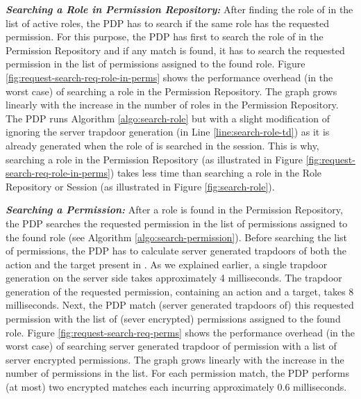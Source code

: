 \documentclass[final,5p,times,twocolumn]{elsarticle}
\begin{document}
\emph{\textbf{Searching a Role in Permission Repository:}}
After finding the role of  in the list of active roles, the PDP has to search if the same role has the requested permission. For this purpose, the PDP has first to search the role of  in the Permission Repository and if any match is found, it has to search the requested permission in the list of permissions assigned to the found role. Figure \ref{fig:request-search-req-role-in-perms} shows the performance overhead (in the worst case) of searching a role in the Permission Repository. The graph grows linearly with the increase in the number of roles in the Permission Repository. The PDP runs Algorithm \ref{algo:search-role} but with a slight modification of ignoring the server trapdoor generation (in Line \ref{line:search-role-td}) as it is already generated when the role of  is searched in the session. This is why, searching a role in the Permission Repository (as illustrated in Figure \ref{fig:request-search-req-role-in-perms}) takes less time than searching a role in the Role Repository or Session (as illustrated in Figure \ref{fig:search-role}).

\emph{\textbf{Searching a Permission:}}
After a role is found in the Permission Repository, the PDP searches the requested permission in the list of permissions assigned to the found role (see Algorithm \ref{algo:search-permission}). Before searching the list of permissions, the PDP has to calculate server generated trapdoors of both the action and the target present in . As we explained earlier, a single trapdoor generation on the server side takes approximately 4 milliseconds. The trapdoor generation of the requested permission, containing an action and a target, takes 8 milliseconds. Next, the PDP match (server generated trapdoors of) this requested permission with the list of (sever encrypted) permissions assigned to the found role. Figure \ref{fig:request-search-req-perms} shows the performance overhead (in the worst case) of searching server generated trapdoor of permission with a list of server encrypted permissions. The graph grows linearly with the increase in the number of permissions in the list. For each permission match, the PDP performs (at most) two encrypted matches each incurring approximately 0.6 milliseconds.
\end{document}

